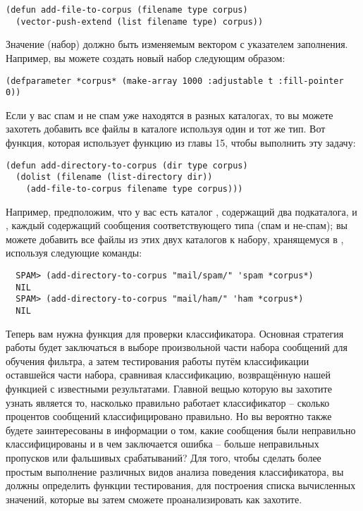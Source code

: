 \begin{lstlisting}
(defun add-file-to-corpus (filename type corpus)
  (vector-push-extend (list filename type) corpus))
\end{lstlisting}

Значение  (набор) должно быть изменяемым вектором с указателем заполнения.
Например, вы можете создать новый набор следующим образом:

\begin{lstlisting}
(defparameter *corpus* (make-array 1000 :adjustable t :fill-pointer 0))
\end{lstlisting}

Если у вас спам и не спам уже находятся в разных каталогах, то вы можете захотеть добавить
все файлы в каталоге используя один и тот же тип.  Вот функция, которая использует функцию
 из главы 15, чтобы выполнить эту задачу:

\begin{lstlisting}
(defun add-directory-to-corpus (dir type corpus)
  (dolist (filename (list-directory dir))
    (add-file-to-corpus filename type corpus)))
\end{lstlisting}

Например, предположим, что у вас есть каталог , содержащий два подкаталога,
 и , каждый содержащий сообщения соответствующего типа (спам и
не-спам); вы можете добавить все файлы из этих двух каталогов к набору, хранящемуся в
, используя следующие команды:

\begin{verbatim}
  SPAM> (add-directory-to-corpus "mail/spam/" 'spam *corpus*)
  NIL
  SPAM> (add-directory-to-corpus "mail/ham/" 'ham *corpus*)
  NIL
\end{verbatim}

Теперь вам нужна функция для проверки классификатора.  Основная стратегия работы будет
заключаться в выборе произвольной части набора сообщений для обучения фильтра, а затем
тестирования работы путём классификации оставшейся части набора, сравнивая классификацию,
возвращённую нашей функцией с известными результатами.  Главной вещью которую вы захотите
узнать является то, насколько правильно работает классификатор -- сколько процентов
сообщений классифицировано правильно.  Но вы вероятно также будете заинтересованы в
информации о том, какие сообщения были неправильно классифицированы и в чем заключается
ошибка -- больше неправильных пропусков или фальшивых срабатываний?  Для того, чтобы
сделать более простым выполнение различных видов анализа поведения классификатора, вы
должны определить функции тестирования, для построения списка вычисленных значений,
которые вы затем сможете проанализировать как захотите.

